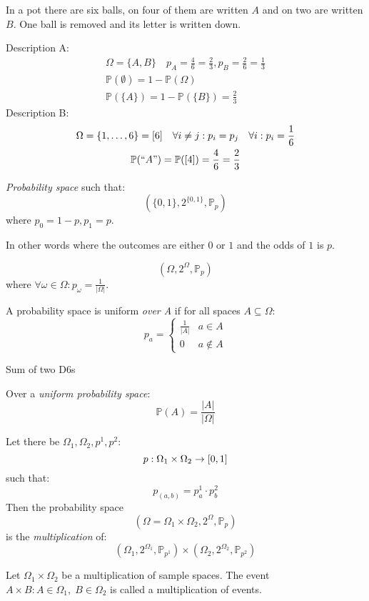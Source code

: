 \documentclass[00_complete]{subfiles}
\begin{document}
\begin{example}
In a pot there are six balls, on four of them are written $A$ and on two are
written $B$. One ball is removed and its letter is written down.

Description A:
\begin{gather*}
    \Omega =\{A,B\} \quad p_A = \frac{4}{6}=\frac{2}{3},
    p_B=\frac{2}{6}=\frac{1}{3} \\
    \mathbb{P}(\emptyset)=1-\mathbb{P}(\Omega) \\
    \mathbb{P}(\{A\})=1-\mathbb{P}(\{B\})=\frac{2}{3}
\end{gather*}
Description B:
\begin{gather*}
    \Omega =\{1,\dots,6\}=[6] \quad \forall i\neq j: p_i = p_j \quad \forall
    i:p_i=\frac{1}{6}\\
    \mathbb{P}(``A")=\mathbb{P}([4])=\frac{4}{6}=\frac{2}{3} \\
\end{gather*}
\end{example}
\begin{definition}
    \emph{Probability space} such that:
    \[
        \left(\{0,1\},2^{\{0,1\}},\mathbb{P}_p\right)
    \]
    where $p_0=1-p, p_1=p$.

    In other words where the outcomes are either $0$ or $1$ and the odds of $1$
    is $p$.
\end{definition}
\begin{definition}
   $$(\Omega,2^{\Omega},\mathbb{P}_p)$$
   where $\forall \omega \in \Omega: p_\omega=\frac{1}{|\Omega|}$.

   A probability space is uniform \emph{over A} if for all spaces $A
   \subseteq \Omega$:
   \[
       p_a=
       \begin{cases}
           \frac{1}{|A|} & a \in A \\
           0 & a \notin A
       \end{cases}
   \]
\end{definition}
\begin{example}
    Sum of two D6s
\end{example}
\begin{claim}
    Over a \emph{uniform probability space}:
    \[
        \mathbb{P}(A)=\frac{|A|}{|\Omega|}
    \]
\end{claim}
\begin{definition}
    Let there be $\Omega_1, \Omega_2, p^1, p^2$:
    \[
        p:\Omega_1\times\Omega_2\to [0,1] \\
    \]
    such that:
    \[
        p_{(a,b)}=p^1_a\cdot p^2_b
    \]
    Then the probability space
    \[
        (\Omega=\Omega_1\times\Omega_2,2^\Omega,\mathbb{P}_p)
    \]
    is the \emph{multiplication} of:
    \[
        (\Omega_1,2^{\Omega_1},\mathbb{P}_{p^1}) \times
        (\Omega_2,2^{\Omega_2},\mathbb{P}_{p^2})
    \]
\end{definition}
\begin{definition}
    Let $\Omega_1\times \Omega_2$ be a multiplication of sample spaces. The
    event $A\times B: A\in \Omega_1,\; B \in \Omega_2$ is called a
    multiplication of events.
\end{definition}
\end{document}
